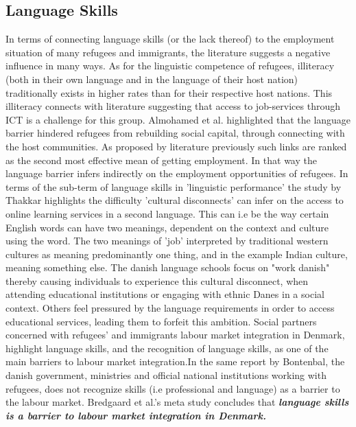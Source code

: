 \subsection{Language Skills}

In terms of connecting language skills (or the lack thereof) to the employment situation of many refugees and immigrants, the literature suggests a negative influence in many ways. As for the linguistic competence of refugees, illiteracy (both in their own language and in the language of their host nation) traditionally exists in higher rates than for their respective host nations\cite{Marshall}\cite{UN}. This illiteracy connects with literature suggesting that access to job-services through ICT \cite{AhmedKhan2017} is a challenge for this group. Almohamed et al.\cite{Almohamamed2018} highlighted that the language barrier hindered refugees from rebuilding social capital, through connecting with the host communities. As proposed by literature previously\cite{shuttleworth2008incapacity}\cite{green2011job} such links are ranked as the second most effective mean of getting employment. In that way the language barrier infers indirectly on the employment opportunities of refugees\cite{Hauck2014}. In terms of the sub-term of language skills in 'linguistic performance' the study by Thakkar \cite{Thakkar} highlights the difficulty 'cultural disconnects' can infer on the access to online learning services in a second language. This can i.e be the way certain English words can have two meanings, dependent on the context and culture using the word. The two meanings of 'job' interpreted by traditional western cultures as meaning predominantly one thing, and in the example Indian culture, meaning something else. The danish language schools focus on "work danish"\cite{Sirius} thereby causing individuals to experience this cultural disconnect, when attending educational institutions or engaging with ethnic Danes in a social context. Others feel pressured by the language requirements in order to access educational services, leading them to forfeit this ambition\cite{Sirius}. Social partners concerned with refugees' and immigrants labour market integration in Denmark, highlight language skills, and the recognition of language skills, as one of the main barriers to labour market integration\cite{Bontenbal2019}.In the same report by Bontenbal, the danish government, ministries and official national institutions working with refugees, does not recognize skills (i.e professional and language) as a barrier to the labour market. Bredgaard et al.'s meta study concludes that \textbf{\emph{language skills is a barrier to labour market integration in Denmark.}}\cite{Bredgaard2018}  

